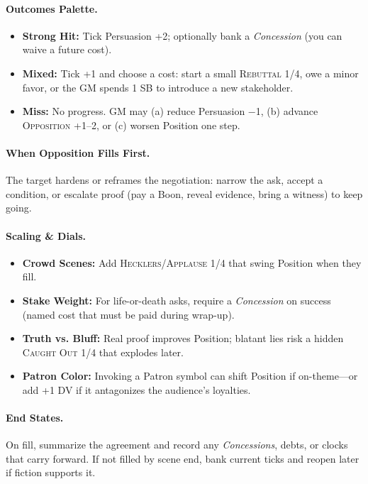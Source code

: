 \paragraph{Outcomes Palette.}
\begin{itemize}
  \item \textbf{Strong Hit:} Tick Persuasion +2; optionally bank a \emph{Concession} (you can waive a future cost).
  \item \textbf{Mixed:} Tick +1 and choose a cost: start a small \textsc{Rebuttal 1/4}, owe a minor favor, or the GM spends 1 SB to introduce a new stakeholder.
  \item \textbf{Miss:} No progress. GM may (a) reduce Persuasion −1, (b) advance \textsc{Opposition} +1–2, or (c) worsen Position one step.
\end{itemize}

\paragraph{When Opposition Fills First.}
The target hardens or reframes the negotiation: narrow the ask, accept a condition, or escalate proof (pay a Boon, reveal evidence, bring a witness) to keep going.

\paragraph{Scaling & Dials.}
\begin{itemize}
  \item \textbf{Crowd Scenes:} Add \textsc{Hecklers}/\textsc{Applause} 1/4 that swing Position when they fill.
  \item \textbf{Stake Weight:} For life-or-death asks, require a \emph{Concession} on success (named cost that must be paid during wrap-up).
  \item \textbf{Truth vs. Bluff:} Real proof improves Position; blatant lies risk a hidden \textsc{Caught Out} 1/4 that explodes later.
  \item \textbf{Patron Color:} Invoking a Patron symbol can shift Position if on-theme—or add +1 DV if it antagonizes the audience’s loyalties.
\end{itemize}

\paragraph{End States.}
On fill, summarize the agreement and record any \emph{Concessions}, debts, or clocks that carry forward. If not filled by scene end, bank current ticks and reopen later if fiction supports it.
